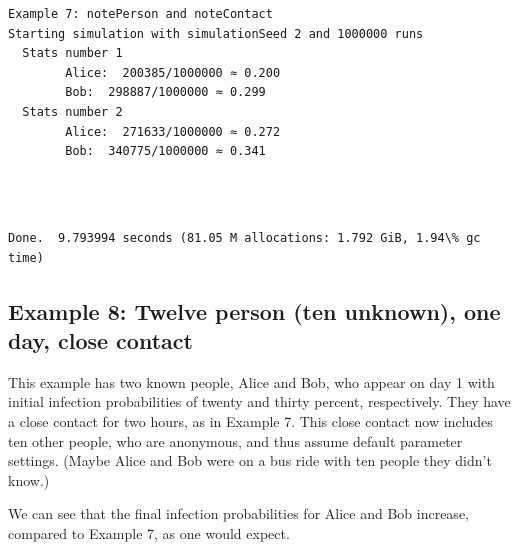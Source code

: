 \documentclass[11pt]{article}
\begin{document}
    \begin{Verbatim}[commandchars=\\\{\}]
Example 7: notePerson and noteContact
Starting simulation with simulationSeed 2 and 1000000 runs
  Stats number 1
        Alice:  200385/1000000 ≈ 0.200
        Bob:  298887/1000000 ≈ 0.299
  Stats number 2
        Alice:  271633/1000000 ≈ 0.272
        Bob:  340775/1000000 ≈ 0.341
    \end{Verbatim}

    \begin{center}
    \end{center}
    { \hspace*{\fill} \\}
    
    \begin{Verbatim}[commandchars=\\\{\}]

Done.  9.793994 seconds (81.05 M allocations: 1.792 GiB, 1.94\% gc time)
    \end{Verbatim}
\newpage
    \hypertarget{example-8-twelve-person-ten-unknown-one-day-close-contact}{%
\subsection{Example 8: Twelve person (ten unknown), one day, close
contact}\label{example-8-twelve-person-ten-unknown-one-day-close-contact}}

This example has two known people, Alice and Bob, who appear on day 1
with initial infection probabilities of twenty and thirty percent,
respectively. They have a close contact for two hours, as in Example 7.
This close contact now includes ten other people, who are anonymous, and
thus assume default parameter settings. (Maybe Alice and Bob were on a
bus ride with ten people they didn't know.)

We can see that the final infection probabilities for Alice and Bob
increase, compared to Example 7, as one would expect.
\end{document}
